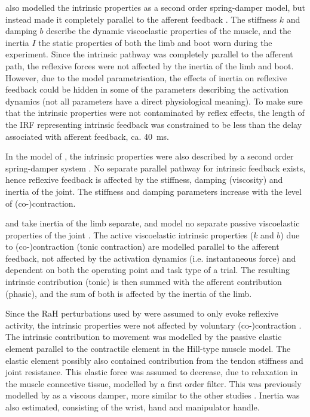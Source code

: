 \citeauthor{mirbagheri_intrinsic_2000} also modelled the intrinsic properties as a second order spring-damper model, but instead made it completely parallel to the afferent feedback \cite{mirbagheri_intrinsic_2000}. The stiffness $k$ and damping $b$ describe the dynamic viscoelastic properties of the muscle, and the inertia $I$ the static properties of both the limb and boot worn during the experiment. Since the intrinsic pathway was completely parallel to the afferent path, the reflexive forces were not affected by the inertia of the limb and boot. However, due to the model parametrisation, the effects of inertia on reflexive feedback could be hidden in some of the parameters describing the activation dynamics (not all parameters have a direct physiological meaning). To make sure that the intrinsic properties were not contaminated by reflex effects, the length of the IRF representing intrinsic feedback was constrained to be less than the delay associated with afferent feedback, ca. \SI{40}{\milli\second}. 

In the model of \citeauthor{van_der_helm_identification_2002}, the intrinsic properties were also described by a second order spring-damper system \cite{van_der_helm_identification_2002}. No separate parallel pathway for intrinsic feedback exists, hence reflexive feedback is affected by the stiffness, damping (viscosity) and inertia of the joint. The stiffness and damping parameters increase with the level of (co-)contraction. 

\citeauthor{schouten_nmclab_2008} and \citeauthor{mugge_rigorous_2010} take inertia of the limb separate, and model no separate passive viscoelastic properties of the joint \cite{schouten_nmclab_2008, mugge_rigorous_2010}. The active viscoelastic intrinsic properties ($k$ and $b$) due to (co-)contraction (tonic contraction) are modelled parallel to the afferent feedback, not affected by the activation dynamics (i.e. instantaneous force) and dependent on both the operating point and task type of a trial. The resulting intrinsic contribution (tonic) is then summed with the afferent contribution (phasic), and the sum of both is affected by the inertia of the limb.

Since the RaH perturbations used by \citeauthor{de_gooijer-van_de_groep_estimation_2016} were assumed to only evoke reflexive activity, the intrinsic properties were not affected by voluntary (co-)contraction \cite{de_gooijer-van_de_groep_estimation_2016}. The intrinsic contribution to movement was modelled by the passive elastic element parallel to the contractile element in the Hill-type muscle model. The elastic element possibly also contained contribution from the tendon stiffness and joint resistance. This elastic force was assumed to decrease, due to relaxation in the muscle connective tissue, modelled by a first order filter. This was previously modelled by \citeauthor{de_vlugt_relation_2010} as a viscous damper, more similar to the other studies \cite{de_vlugt_relation_2010}. Inertia was also estimated, consisting of the wrist, hand and manipulator handle. 

